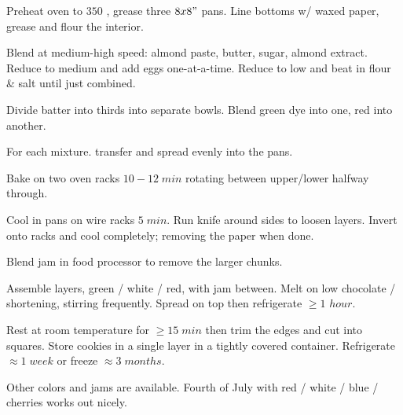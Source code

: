 \begin{preparation}
\item Preheat oven to $350$ \Fahrenheit, grease three $8x8"$ pans.
Line bottoms w/ waxed paper, grease and flour the interior.

\item Blend at medium-high speed: almond paste, butter, sugar, almond extract.
Reduce to medium and add eggs one-at-a-time.
Reduce to low and beat in flour \& salt until just combined.

\item Divide batter into thirds into separate bowls.
Blend green dye into one, red into another.

\item For each mixture. transfer and spread evenly into the pans.

\item Bake on two oven racks $10-12\; min$ rotating between upper/lower halfway through.

\item Cool in pans on wire racks $5\; min$.
Run knife around sides to loosen layers. Invert onto racks and cool completely; removing the paper when done.

\item Blend jam in food processor to remove the larger chunks.

\item Assemble layers, green / white / red, with jam between.
Melt on low chocolate / shortening, stirring frequently.
Spread on top then refrigerate $\geq1$ $hour$.

\item Rest at room temperature for $\geq 15\; min$ then trim the edges and cut into squares.
Store cookies in a single layer in a tightly covered container.
Refrigerate $\approx 1\; week$ or freeze $\approx 3\; months$.
\end{preparation}

\begin{variation}
\item Other colors and jams are available. Fourth of July with red / white / blue / cherries works out nicely.
\end{variation}
\recipeend